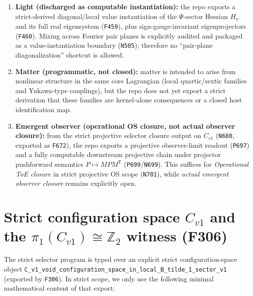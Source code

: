 \documentclass[11pt,a4paper]{article}
\makeatletter
\newcommand{\chapter}{\@ifstar{\section*}{\section}}
\makeatother
\begin{document}
\begin{enumerate}[label=\arabic*.]
  \item \textbf{Light (discharged as computable instantiation):}
  the repo exports a strict-derived diagonal/local value instantiation of the $\Psi$-sector Hessian $H_{\psi}$ and its full real eigensystem (\texttt{F459}),
  plus sign-gauge-invariant eigenprojectors (\texttt{F460}).
  Mixing across Fourier pair planes is explicitly audited and packaged as a value-instantiation boundary (\texttt{N505}); therefore no “pair-plane diagonalization” shortcut is allowed.

  \item \textbf{Matter (programmatic, not closed):}
  matter is intended to arise from nonlinear structure in the same core Lagrangian (local quartic/sextic families and Yukawa-type couplings),
  but the repo does not yet export a strict derivation that these families are kernel-alone consequences or a closed host identification map.

  \item \textbf{Emergent observer (operational OS closure, not actual observer closure):}
  from the strict projective selector closure output on $C_{v1}$ (\texttt{N680}, exported as \texttt{F672}), the repo exports a projective observer-limit readout (\texttt{P697})
  and a fully computable downstream projective chain under projector pushforward semantics $P\mapsto MPM^{\mathsf T}$ (\texttt{P699}/\texttt{N699}).
  This suffices for \emph{Operational ToE closure} in strict projective OS scope (\texttt{N701}), while \emph{actual emergent observer closure} remains explicitly open.
\end{enumerate}

\chapter{Selector closure on \texorpdfstring{$C_{v1}$}{C\_v1}}
\section{Strict configuration space \texorpdfstring{$C_{v1}$}{C\_v1} and the \texorpdfstring{$\pi_1(C_{v1})\cong\mathbb{Z}_2$}{pi1(C\_v1)=Z2} witness (F306)}

The strict selector program is typed over an explicit strict configuration-space object \texttt{C\_v1\_void\_configuration\_space\_in\_local\_B\_tilde\_1\_sector\_v1} (exported by \texttt{F306}).
In strict scope, we only use the following minimal mathematical content of that export:
\end{document}
